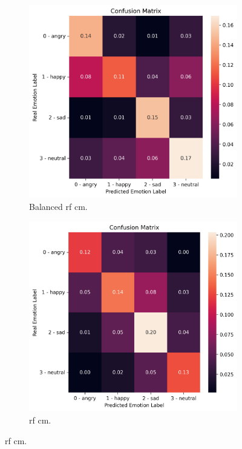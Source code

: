 \begin{figure}[H]
	\newline
	\begin{subfigure}{.5\textwidth}
		\centering
		\includegraphics[width=.9\linewidth]{figs/appendix/feature_selection/BalancedForestCM.png}
		\caption{Balanced \ac{rf} \ac{cm}.}
	\end{subfigure}%
	\begin{subfigure}{.5\textwidth}
		\centering
		\includegraphics[width=.9\linewidth]{figs/appendix/feature_selection/RandomForestCM.png}
		\caption{\ac{rf} \ac{cm}.}
	\end{subfigure}

\end{figure}
